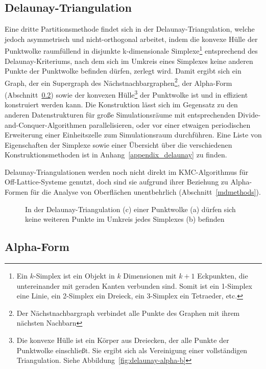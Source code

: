 \subsection{Delaunay-Triangulation}
\label{datadelaunay}

Eine dritte Partitionsmethode findet sich in der Delaunay-Triangulation\cite{su_comparison_1995}, welche jedoch asymmetrisch und nicht-orthogonal arbeitet, indem die konvexe Hülle der Punktwolke raumfüllend in disjunkte k-dimensionale Simplexe\footnote{Ein $k$-Simplex ist ein Objekt in $k$ Dimensionen mit $k+1$ Eckpunkten, die untereinander mit geraden Kanten verbunden sind. Somit ist ein 1-Simplex eine Linie, ein 2-Simplex ein Dreieck, ein 3-Simplex ein Tetraeder, etc.}
entsprechend des Delaunay-Kriteriums, nach dem sich im Umkreis eines Simplexes keine anderen Punkte der Punktwolke befinden dürfen, zerlegt wird.
Damit ergibt sich ein Graph, der ein Supergraph des Nächstnachbargraphen\footnote{Der Nächstnachbargraph verbindet alle Punkte des Graphen mit ihrem nächsten Nachbarn}, der Alpha-Form (Abschnitt~\ref{dataalphaform}) sowie der konvexen Hülle\footnote{Die konvexe Hülle ist ein Körper aus Dreiecken, der alle Punkte der Punktwolke einschließt. Sie ergibt sich als Vereinigung einer vollständigen Triangulation. Siehe Abbildung~\ref{fig:delaunay-alpha-b}} der Punktwolke ist und in  effizient konstruiert werden kann.
Die Konstruktion lässt sich im Gegensatz zu den anderen Datenstrukturen für große Simulationsräume mit entsprechenden Divide-and-Conquer-Algorithmen parallelisieren, oder vor einer etwaigen periodischen Erweiterung einer Einheitszelle zum Simulationsraum durchführen.
Eine Liste von Eigenschaften der Simplexe sowie einer Übersicht über die verschiedenen Konstruktionsmethoden ist in Anhang~\ref{appendix_delaunay} zu finden.

Delaunay-Triangulationen werden noch nicht direkt im KMC-Algorithmus für Off-Lattice-Systeme genutzt, doch sind sie aufgrund ihrer Beziehung zu Alpha-Formen für die Analyse von Oberflächen unentbehrlich (Abschnitt~\ref{mdmethods}).

\begin{figure}[H]
  \centering
  \def\svgwidth{\textwidth}
  
  \caption[Beispiel des Delaunay-Kriteriums]{
    In der Delaunay-Triangulation (c) einer Punktwolke (a) dürfen sich keine weiteren Punkte im Umkreis jedes Simplexes (b) befinden
  }
  \label{fig:delaunay}
\end{figure}

\subsection{Alpha-Form}
\label{dataalphaform}

